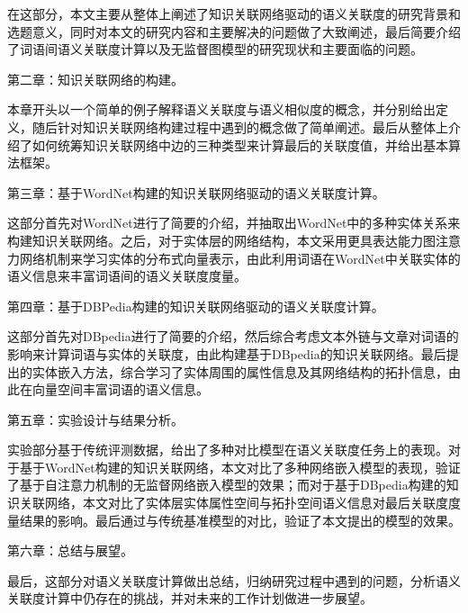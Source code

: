 在这部分，本文主要从整体上阐述了知识关联网络驱动的语义关联度的研究背景和选题意义，同时对本文的研究内容和主要解决的问题做了大致阐述，最后简要介绍了词语间语义关联度计算以及无监督图模型的研究现状和主要面临的问题。

第二章：知识关联网络的构建。

本章开头以一个简单的例子解释语义关联度与语义相似度的概念，并分别给出定义，随后针对知识关联网络构建过程中遇到的概念做了简单阐述。最后从整体上介绍了如何统筹知识关联网络中边的三种类型来计算最后的关联度值，并给出基本算法框架。

第三章：基于WordNet构建的知识关联网络驱动的语义关联度计算。

这部分首先对WordNet进行了简要的介绍，并抽取出WordNet中的多种实体关系来构建知识关联网络。之后，对于实体层的网络结构，本文采用更具表达能力图注意力网络机制来学习实体的分布式向量表示，由此利用词语在WordNet中关联实体的语义信息来丰富词语间的语义关联度度量。


第四章：基于DBPedia构建的知识关联网络驱动的语义关联度计算。

这部分首先对DBpedia进行了简要的介绍，然后综合考虑文本外链与文章对词语的影响来计算词语与实体的关联度，由此构建基于DBpedia的知识关联网络。最后提出的实体嵌入方法，综合学习了实体周围的属性信息及其网络结构的拓扑信息，由此在向量空间丰富词语的语义信息。

第五章：实验设计与结果分析。

实验部分基于传统评测数据，给出了多种对比模型在语义关联度任务上的表现。对于基于WordNet构建的知识关联网络，本文对比了多种网络嵌入模型的表现，验证了基于自注意力机制的无监督网络嵌入模型的效果；而对于基于DBpedia构建的知识关联网络，本文对比了实体层实体属性空间与拓扑空间语义信息对最后关联度度量结果的影响。最后通过与传统基准模型的对比，验证了本文提出的模型的效果。


第六章：总结与展望。

最后，这部分对语义关联度计算做出总结，归纳研究过程中遇到的问题，分析语义关联度计算中仍存在的挑战，并对未来的工作计划做进一步展望。
